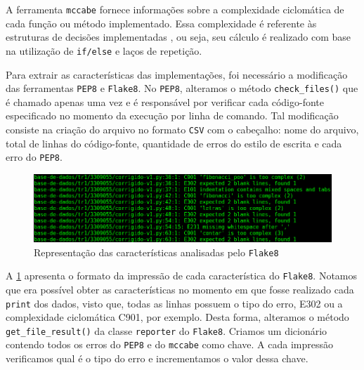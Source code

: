 %	
	
	A ferramenta \texttt{mccabe} \cite{mccabe2013} fornece informações sobre a
	complexidade ciclomática \cite{mccabe} de cada função ou método implementado.
	Essa complexidade é referente às estruturas de decisões implementadas \cite{mccabe},
	ou seja, seu cálculo é realizado com base na utilização de \texttt{if/else} e laços
	de repetição.
	
	Para extrair as características das implementações, foi necessário a modificação
	das ferramentas \texttt{PEP8} e \texttt{Flake8}. No \texttt{PEP8}, alteramos o
	método \texttt{check\_files()} que é chamado apenas uma vez e é responsável por
	verificar cada código-fonte especificado no momento da execução por linha de
	comando. Tal modificação consiste na criação do arquivo no formato \texttt{CSV}
	com o cabeçalho: nome do arquivo, total de linhas do código-fonte, quantidade
	de erros do estilo de escrita e cada erro do \texttt{PEP8}.
	
	\begin{figure}[h]
		\centering
		\includegraphics[width=0.7\linewidth]{imagem/flake8}
		\caption{Representação das características analisadas pelo \texttt{Flake8}}
		\label{fig:flake8}
	\end{figure}
	
	A \cref{fig:flake8} apresenta o formato da impressão de cada característica do
	\texttt{Flake8}. Notamos que era possível obter as características no momento em
	que fosse realizado cada \texttt{print} dos dados, visto que, todas as linhas
	possuem o tipo do erro, E302 ou a complexidade ciclomática C901, por exemplo.
	Desta forma, alteramos o método \texttt{get\_file\_result()} da classe
	\texttt{reporter} do \texttt{Flake8}. Criamos um dicionário contendo todos os
	erros do \texttt{PEP8} e do \texttt{mccabe} como chave. A cada impressão
	verificamos qual é o tipo do erro e incrementamos o valor dessa chave.
	
